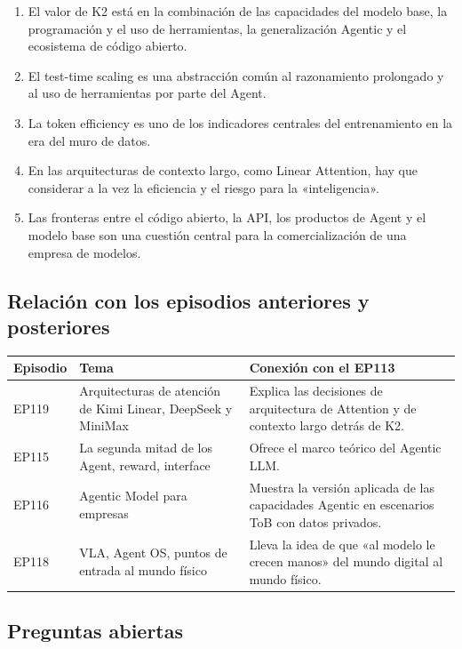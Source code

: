\documentclass[a4paper]{article}
\begin{document}
\begin{enumerate}
\item El valor de K2 está en la combinación de las capacidades del modelo base, la programación y el uso de herramientas, la generalización Agentic y el ecosistema de código abierto.
\item El test-time scaling es una abstracción común al razonamiento prolongado y al uso de herramientas por parte del Agent.
\item La token efficiency es uno de los indicadores centrales del entrenamiento en la era del muro de datos.
\item En las arquitecturas de contexto largo, como Linear Attention, hay que considerar a la vez la eficiencia y el riesgo para la «inteligencia».
\item Las fronteras entre el código abierto, la API, los productos de Agent y el modelo base son una cuestión central para la comercialización de una empresa de modelos.
\end{enumerate}

\subsection{Relación con los episodios anteriores y posteriores}

\begin{tabularx}{\textwidth}{p{}p{}X}
\toprule
Episodio & Tema & Conexión con el EP113 \\
\midrule
EP119 & Arquitecturas de atención de Kimi Linear, DeepSeek y MiniMax & Explica las decisiones de arquitectura de Attention y de contexto largo detrás de K2. \\
EP115 & La segunda mitad de los Agent, reward, interface & Ofrece el marco teórico del Agentic LLM. \\
EP116 & Agentic Model para empresas & Muestra la versión aplicada de las capacidades Agentic en escenarios ToB con datos privados. \\
EP118 & VLA, Agent OS, puntos de entrada al mundo físico & Lleva la idea de que «al modelo le crecen manos» del mundo digital al mundo físico. \\
\bottomrule
\end{tabularx}

\subsection{Preguntas abiertas}
\end{document}
